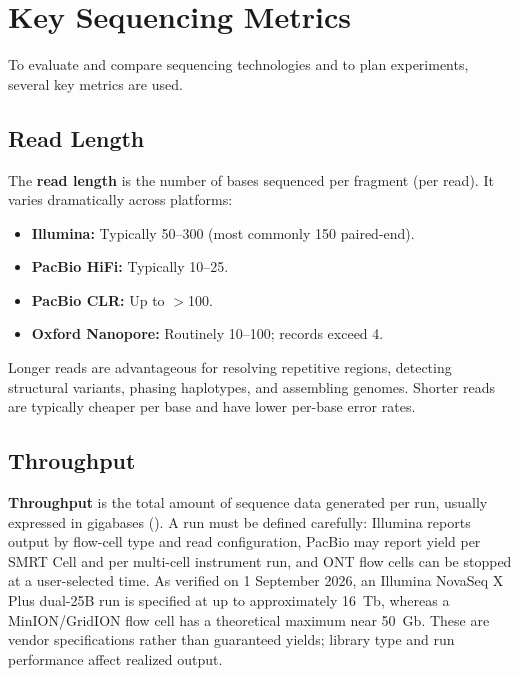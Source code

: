 \section{Key Sequencing Metrics}
\label{sec:seqprinciples:metrics}

To evaluate and compare sequencing technologies and to plan experiments, several key metrics are used.

\subsection{Read Length}
\label{subsec:seqprinciples:read-length}

The \textbf{read length} is the number of bases sequenced per fragment (per read). It varies dramatically across platforms:

\begin{itemize}[itemsep=2pt]
  \item \textbf{Illumina:} Typically 50--300\basepair{} (most commonly 150\basepair{} paired-end).
  \item \textbf{PacBio HiFi:} Typically 10--25\kilobase{}.
  \item \textbf{PacBio CLR:} Up to $>$100\kilobase{}.
  \item \textbf{Oxford Nanopore:} Routinely 10--100\kilobase{}; records exceed 4\megabase{}.
\end{itemize}

Longer reads are advantageous for resolving repetitive regions, detecting structural variants, phasing haplotypes, and assembling genomes. Shorter reads are typically cheaper per base and have lower per-base error rates.

\subsection{Throughput}
\label{subsec:seqprinciples:throughput}

\textbf{Throughput} is the total amount of sequence data generated per run, usually expressed in gigabases (\gigabase{}). A run must be defined carefully: Illumina reports output by flow-cell type and read configuration, PacBio may report yield per SMRT Cell and per multi-cell instrument run, and ONT flow cells can be stopped at a user-selected time. As verified on 1 September 2026, an Illumina NovaSeq X Plus dual-25B run is specified at up to approximately 16~Tb, whereas a MinION/GridION flow cell has a theoretical maximum near 50~Gb. These are vendor specifications rather than guaranteed yields; library type and run performance affect realized output.

